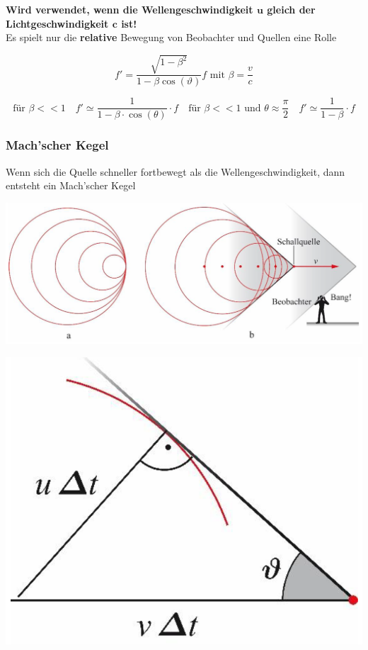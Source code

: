 \textbf{Wird verwendet, wenn die Wellengeschwindigkeit $\boldsymbol{u}$ gleich der Lichtgeschwindigkeit $\boldsymbol{c}$ ist!} \\

Es spielt nur die \textbf{relative} Bewegung von Beobachter und Quellen eine Rolle

$$ \boxed{f' = \frac{\sqrt{1-\beta^2}}{1 - \beta \cos(\vartheta)}f \text{ mit } \beta = \frac{v}{c} } $$


$$ \text{für } \beta << 1 \quad f' \simeq \frac{1}{1- \beta \cdot \cos(\theta)} \cdot f  \quad \text{für } \beta << 1 \text{ und } \theta \approx \frac{\pi}{2} \quad f' \simeq \frac{1}{1- \beta } \cdot f $$



\subsubsection{Mach'scher Kegel}
Wenn sich die Quelle schneller fortbewegt als die Wellengeschwindigkeit, dann entsteht ein Mach'scher Kegel \\



\begin{minipage}{0.6\linewidth}
\includegraphics[width=0.95\linewidth]{Bilder/Wellen-Optik/machkegel_1} \\
\end{minipage}
\hfill
\begin{minipage}{0.38\linewidth}
\includegraphics[width=0.95\linewidth]{Bilder/Wellen-Optik/machkegel_2} \\
\end{minipage}


